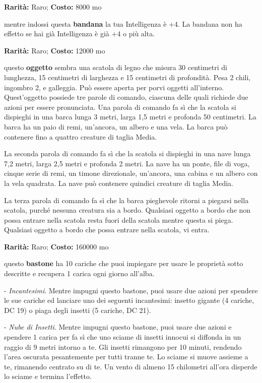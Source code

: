 \begin{multicols}{2}

\textbf{Rarità:} Raro; \textbf{Costo:} 8000 mo

mentre indossi questa \textbf{bandana} la tua Intelligenza è +4. La bandana non ha effetto se hai già Intelligenza è già +4 o più alta.


\textbf{Rarità:} Raro; \textbf{Costo:} 12000 mo

questo \textbf{oggetto} sembra una scatola di legno che misura 30 centimetri di lunghezza, 15 centimetri di larghezza e 15 centimetri di profondità. Pesa 2 chili, ingombro 2, e galleggia. Può essere aperta per porvi oggetti all'interno. Quest'oggetto possiede tre parole di comando, ciascuna delle quali richiede due azioni per essere pronunciata. Una parola di comando fa sì che la scatola si dispieghi in una barca lunga 3 metri, larga 1,5 metri e profonda 50 centimetri. La barca ha un paio di remi, un'ancora, un albero e una vela. La barca può contenere fino a quattro creature di taglia Media.

La seconda parola di comando fa sì che la scatola si dispieghi in una nave lunga 7,2 metri, larga 2,5 metri e profonda 2 metri. La nave ha un ponte, file di voga, cinque serie di remi, un timone direzionale, un'ancora, una cabina e un albero con la vela quadrata. La nave può contenere quindici creature di taglia Media.

La terza parola di comando fa sì che la barca pieghevole ritorni a piegarsi nella scatola, purché nessuna creatura sia a bordo. Qualsiasi oggetto a bordo che non possa entrare nella scatola resta fuori della scatola mentre questa si piega. Qualsiasi oggetto a bordo che possa entrare nella scatola, vi entra.


\textbf{Rarità:} Raro; \textbf{Costo:} 160000 mo

questo \textbf{bastone} ha 10 cariche che puoi impiegare per usare le proprietà sotto descritte e recupera 1 carica ogni giorno all'alba.

- \emph{Incantesimi}. Mentre impugni questo bastone, puoi usare due azioni per spendere le sue cariche ed lanciare uno dei seguenti incantesimi: insetto gigante (4 cariche, DC 19) o piaga degli insetti (5 cariche, DC 21).

- \emph{Nube di Insetti}. Mentre impugni questo bastone, puoi usare due azioni e spendere 1 carica per fa sì che uno sciame di insetti innocui si diffonda in un raggio di 9 metri intorno a te. Gli insetti rimangono per 10 minuti, rendendo l'area oscurata pesantemente per tutti tranne te. Lo sciame si muove assieme a te, rimanendo centrato su di te. Un vento di almeno 15 chilometri all'ora disperde lo sciame e termina l'effetto.


\end{multicols}

